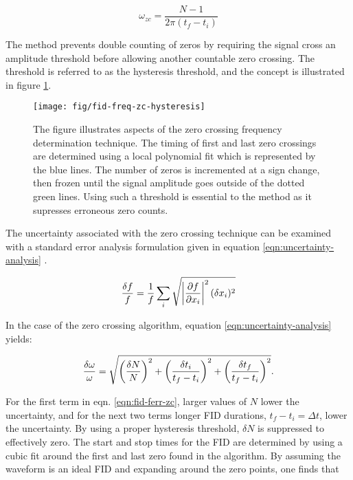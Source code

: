\begin{equation}
\label{eqn:fid-freq-zc}
\omega_{zc} = \frac{N - 1}{2 \pi(t_f - t_i)}
\end{equation}

\noindent
The method prevents double counting of zeros by requiring the signal cross an amplitude threshold before allowing another countable zero crossing.  The threshold is referred to as the hysteresis threshold, and the concept is illustrated in figure \ref{fig:fid-freq-zc-hysteresis}.

\begin{figure}
\label{fig:fid-freq-zc-hysteresis}
\texttt{[image: fig/fid-freq-zc-hysteresis]}
\caption{The figure illustrates aspects of the zero crossing frequency determination technique.  The timing of first and last zero crossings are determined using a local polynomial fit which is represented by the blue lines.  The number of zeros is incremented at a sign change, then frozen until the signal amplitude goes outside of the dotted green lines.  Using such a threshold is essential to the method as it supresses erroneous zero counts.}
\end{figure}

The uncertainty associated with the zero crossing technique can be examined with a standard error analysis formulation given in equation \ref{eqn:uncertainty-analysis} \cite{error-taylor}.

\begin{equation}
\label{eqn:uncertainty-analysis}
\frac{\delta f}{f} = \frac{1}{f} \sum_{i} \\
\sqrt{\left| \frac{\partial f}{\partial x_i} \right|^2 (\delta x_i)^2}
\end{equation}

\noindent
In the case of the zero crossing algorithm, equation \ref{eqn:uncertainty-analysis} yields:

\begin{equation}
\label{eqn:fid-ferr-zc}
\frac{\delta \omega}{\omega} = \\
\sqrt{
    \left( \frac{\delta N}{N} \right)^2 +
    \left( \frac{\delta t_i}{t_f - t_i} \right)^2 + 
    \left( \frac{\delta t_f}{t_f - t_i} \right)^2
    }.
\end{equation}

\noindent
For the first term in eqn. \ref{eqn:fid-ferr-zc}, larger values of $N$ lower the uncertainty, and for the next two terms longer FID durations, $t_f - t_i = \Delta t$, lower the uncertainty.  By using a proper hysteresis threshold, $\delta N$ is suppressed to effectively zero. The start and stop times for the FID are determined by using a cubic fit around the first and last zero found in the algorithm.  By assuming the waveform is an ideal FID and expanding around the zero points, one finds that 

